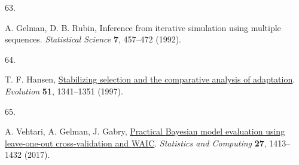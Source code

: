 \documentclass[
  letterpaper,
  DIV=11,
  numbers=noendperiod]{scrartcl}
\newlength{\cslhangindent}
\newlength{\csllabelwidth}
\newenvironment{CSLReferences}[2] %
 {\begin{list}{}{%
  \setlength{\itemindent}{0pt}
  \setlength{\leftmargin}{0pt}
  \setlength{\parsep}{0pt}
  \ifodd #1
   \setlength{\leftmargin}{\cslhangindent}
   \setlength{\itemindent}{-1\cslhangindent}
  \fi
  \setlength{\itemsep}{#2\baselineskip}}}
 {\end{list}}
\newcommand{\CSLLeftMargin}[1]{\parbox[t]{\csllabelwidth}{\strut#1\strut}}
\newcommand{\CSLRightInline}[1]{\parbox[t]{\linewidth - \csllabelwidth}{\strut#1\strut}}
\begin{document}
\begin{CSLReferences}{0}{1}
\CSLLeftMargin{63. }%
\CSLRightInline{A. Gelman, D. B. Rubin, Inference from iterative
simulation using multiple sequences. \emph{Statistical Science}
\textbf{7}, 457--472 (1992).}

\CSLLeftMargin{64. }%
\CSLRightInline{T. F. Hansen,
\href{https://doi.org/10.1111/j.1558-5646.1997.tb01457.x}{Stabilizing
selection and the comparative analysis of adaptation}. \emph{Evolution}
\textbf{51}, 1341--1351 (1997).}

\CSLLeftMargin{65. }%
\CSLRightInline{A. Vehtari, A. Gelman, J. Gabry,
\href{https://doi.org/10.1007/s11222-016-9696-4}{Practical {Bayesian}
model evaluation using leave-one-out cross-validation and {WAIC}}.
\emph{Statistics and Computing} \textbf{27}, 1413--1432 (2017).}

\end{CSLReferences}
\end{document}
